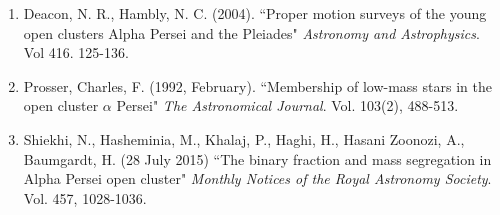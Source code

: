 \documentclass[32pt,portrait]{tikzposter}
\begin{document}
\begin{centering}
\begin{columns}
{\begin{enumerate}
\item Deacon, N. R., Hambly, N. C. (2004). ``Proper motion surveys of the young open clusters Alpha Persei and the Pleiades" \textit{Astronomy and Astrophysics}. Vol 416. 125-136.
\item Prosser, Charles, F. (1992, February). ``Membership of low-mass stars in the open cluster $\alpha$ Persei"  \textit{The Astronomical Journal}. Vol. 103(2), 488-513. 
\item Shiekhi, N., Hasheminia, M., Khalaj, P., Haghi, H., Hasani Zoonozi, A., Baumgardt, H. (28 July 2015) ``The binary fraction and mass segregation in Alpha Persei open cluster" \textit{Monthly Notices of the Royal Astronomy Society}. Vol. 457, 1028-1036.
\end{enumerate}
}



\end{columns}
\end{centering}
\end{document}
